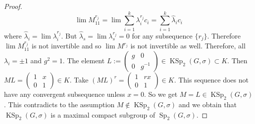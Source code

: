 \documentclass[10pt,a4paper]{amsart}
\DeclareMathOperator{\KSp}{KSp}
\DeclareMathOperator{\Sp}{Sp}
\begin{document}
\begin{proof}
$$\lim M^{r_j}_{11}=\lim\sum_{i=1}^k\lambda_i^{r_j}c_i=\sum_{i=1}^k\hat\lambda_ic_i$$
where $\hat\lambda_i=\lim\lambda_i^{r_j}$. But $\hat\lambda_s=\lim\lambda_s^{r_j}=0$ for any subsequence $\{r_j\}$. Therefore $\lim M^{r_j}_{11}$ is not invertible and so $\lim M^{r_j}$ is not invertible as well. Therefore, all $\lambda_i=\pm 1$ and $g^2=1$. The element $L:=\begin{pmatrix}
g & 0\\
0 & g^{-1}
\end{pmatrix}\in\KSp_2(G,\sigma)\subset K$. Then $ML=\begin{pmatrix}
1 & x \\
0 & 1
\end{pmatrix}\in K$. Take $(ML)^r=\begin{pmatrix}
1 & rx \\
0 & 1
\end{pmatrix}\in K$. This sequence does not have any convergent subsequence unless $x=0$. So we get $M=L\in\KSp_2(G,\sigma)$. This contradicts to the assumption $M\notin\KSp_2(G,\sigma)$ and we obtain that $\KSp_2(G,\sigma)$ is a maximal compact subgroup of $\Sp_2(G,\sigma)$.
\end{proof}
\end{document}
